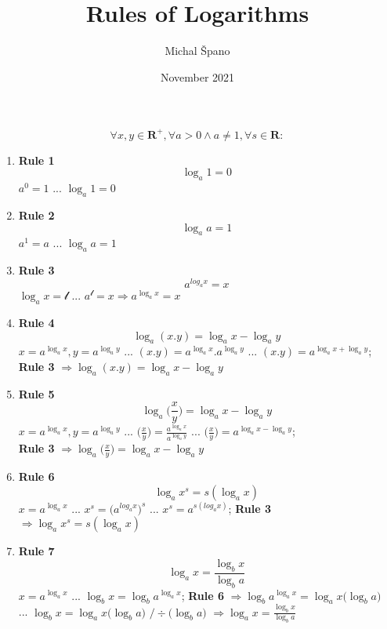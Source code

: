 \documentclass{article}
\title{Rules of Logarithms}
\author{Michal Špano}
\date{November 2021}
\begin{document}
\maketitle

\[\forall x,y \in\mathbf{R^+}, \forall a > 0 \land a \neq 1, \forall s \in\mathbf{R}:\]

\begin{enumerate}
    \item \textbf{Rule 1}
    \[\log_a 1 = 0\]
    $a^0 = 1$ ... $\log_a 1 = 0$
    
    \item \textbf{Rule 2}
    \[\log_a a = 1\]
    $a^1 = a$ ... $\log_a a = 1$
    
    \item \textbf{Rule 3}
    \[a^{log_a x} = x\]
    $\log_a x = \mathscr{l}$ ... $a^\mathscr{l} = x \Rightarrow a^{\log_a x} = x$
    
    \item \textbf{Rule 4}
    \[\log_a (x.y) = \log_a x - \log_a y\]
    $x = a^{\log_a x}, y = a^{\log_a y}$ ... $(x.y) = a^{\log_a x}.a^{\log_a y}$ ... $(x.y) = a^{\log_a x + \log_a y}$;\\ \textbf{Rule 3} $\Rightarrow \log_a (x.y) = \log_a x - \log_a y$
    
    \item \textbf{Rule 5}
    \[\log_a \Big(\frac{x}{y}\Big) = \log_a x - \log_a y\]
    $x = a^{\log_a x}, y = a^{\log_a y}$ ... $\big(\frac{x}{y}\big) = \frac{a^{\log_a x}}{a^{\log_a y}}$ ... $\big(\frac{x}{y}\big) = a^{\log_a x - \log_a y}$;\\
    \textbf{Rule 3} $\Rightarrow \log_a \Big(\frac{x}{y}\Big) = \log_a x - \log_a y$
    
    \item \textbf{Rule 6}
    \[\log_a x^s = s(\log_a x)\]
    $x = a^{\log_a x}$ ... $x^s = \big({a^{log_a x}}\big)^s$ ... $x^s = a^{s(log_a x)}$; \textbf{Rule 3} $\Rightarrow \log_a x^s = s(\log_a x)$
    
    \item \textbf{Rule 7}
    \[\log_a x = \frac{\log_b x}{\log_b a}\]
    $x = a^{\log_a x}$ ... $\log_b x = \log_b a^{\log_a x}$; \textbf{Rule 6} $\Rightarrow \log_b a^{\log_a x} = \log_a x \big(\log_b a\big)$\\... $\log_b x = \log_a x \big(\log_b a\big)$ $/\div\big(\log_b a\big)$ $\Rightarrow \log_a x = \frac{\log_b x}{\log_b a}$
    
\end{enumerate}
\end{document}
